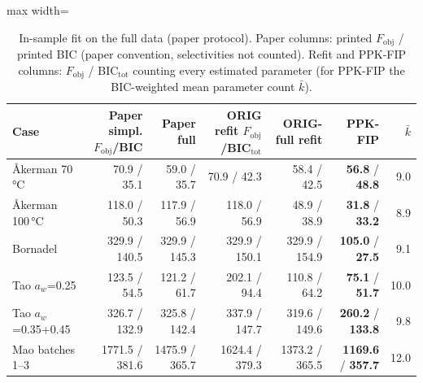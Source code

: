 \begin{table}[t]
\centering
\caption{In-sample fit on the full data (paper protocol). Paper columns: printed $F_\mathrm{obj}$ / printed BIC (paper convention, selectivities not counted). Refit and PPK-FIP columns: $F_\mathrm{obj}$ / BIC$_\mathrm{tot}$ counting every estimated parameter (for PPK-FIP the BIC-weighted mean parameter count $\bar k$).}\label{tab:insample}
\footnotesize
\begin{adjustbox}{max width=\linewidth}
\begin{tabular}{lrrrrrr}
\toprule
Case & Paper simpl. $F_\mathrm{obj}$/BIC & Paper full & ORIG refit $F_\mathrm{obj}$/BIC$_\mathrm{tot}$ & ORIG-full refit & PPK-FIP & $\bar k$ \\
\midrule
Åkerman 70\,°C & 70.9 / 35.1 & 59.0 / 35.7 & 70.9 / 42.3 & 58.4 / 42.5 & \textbf{56.8} / \textbf{48.8} & 9.0 \\
Åkerman 100\,°C & 118.0 / 50.3 & 117.9 / 56.9 & 118.0 / 56.9 & 48.9 / 38.9 & \textbf{31.8} / \textbf{33.2} & 8.9 \\
Bornadel & 329.9 / 140.5 & 329.9 / 145.3 & 329.9 / 150.1 & 329.9 / 154.9 & \textbf{105.0} / \textbf{27.5} & 9.1 \\
Tao $a_w$=0.25 & 123.5 / 54.5 & 121.2 / 61.7 & 202.1 / 94.4 & 110.8 / 64.2 & \textbf{75.1} / \textbf{51.7} & 10.0 \\
Tao $a_w$=0.35+0.45 & 326.7 / 132.9 & 325.8 / 142.4 & 337.9 / 147.7 & 319.6 / 149.6 & \textbf{260.2} / \textbf{133.8} & 9.8 \\
Mao batches 1--3 & 1771.5 / 381.6 & 1475.9 / 365.7 & 1624.4 / 379.3 & 1373.2 / 365.5 & \textbf{1169.6} / \textbf{357.7} & 12.0 \\
\bottomrule
\end{tabular}
\end{adjustbox}
\end{table}
